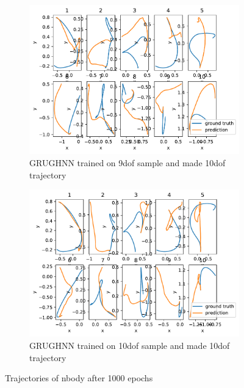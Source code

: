 \begin{figure}[htbp]
	\vspace{0.5cm}
	\begin{subfigure}[b]{0.45\textwidth}
		\centering
		\includegraphics[width=\textwidth]{chapters/chapter5/traj_9dof_10.pdf} %
		\caption{GRUGHNN trained on 9dof sample and made 10dof trajectory}
		\label{fig:sub3}
	\end{subfigure}
	\hfill
	\begin{subfigure}[b]{0.45\textwidth}
		\centering
		\includegraphics[width=\textwidth]{chapters/chapter5/traj_10dof_10.pdf} %
		\caption{GRUGHNN trained on 10dof sample and made 10dof trajectory}
		\label{fig:sub4}
	\end{subfigure}
	\caption{Trajectories of nbody after 1000 epochs}
	\label{fig:body_Traj}
\end{figure}

